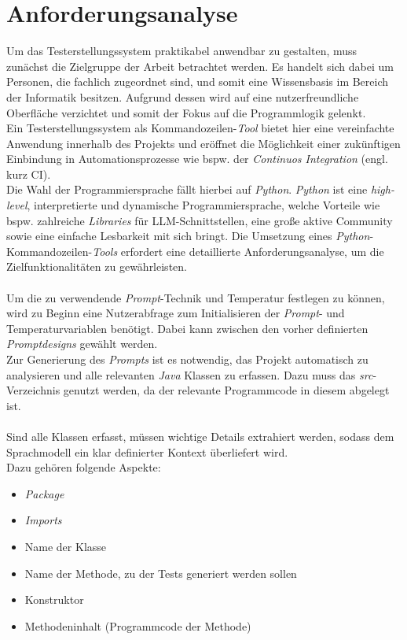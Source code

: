 \section{Anforderungsanalyse}\label{section:anford}
Um das Testerstellungssystem praktikabel anwendbar zu gestalten, muss zunächst die Zielgruppe der Arbeit betrachtet werden. Es handelt sich dabei um Personen, die fachlich zugeordnet sind, und somit eine Wissensbasis im Bereich der Informatik besitzen. Aufgrund dessen wird auf eine nutzerfreundliche Oberfläche verzichtet und somit der Fokus auf die Programmlogik gelenkt.\\ Ein Testerstellungssystem als Kommandozeilen-\textit{Tool} bietet hier eine vereinfachte Anwendung innerhalb des Projekts und eröffnet die Möglichkeit einer zukünftigen Einbindung in Automationsprozesse wie bspw. der \textit{Continuos Integration} (engl. kurz CI).\\ Die Wahl der Programmiersprache fällt hierbei auf \textit{Python}. \textit{Python} ist eine \textit{high-level}, interpretierte und dynamische Programmiersprache, welche Vorteile wie bspw. zahlreiche \textit{Libraries} für LLM-Schnittstellen, eine große aktive Community sowie eine einfache Lesbarkeit mit sich bringt. \cite*{PythonLanguageAdvantages2017} Die Umsetzung eines \textit{Python}-Kommandozeilen-\textit{Tools} erfordert eine detaillierte Anforderungsanalyse, um die Zielfunktionalitäten zu gewährleisten.\\\\
Um die zu verwendende \textit{Prompt}-Technik und Temperatur festlegen zu können, wird zu Beginn eine Nutzerabfrage zum Initialisieren der \textit{Prompt}- und Temperaturvariablen benötigt. Dabei kann zwischen den vorher definierten \textit{Promptdesigns} gewählt werden. \\ Zur Generierung des \textit{Prompts} ist es notwendig, das Projekt automatisch zu analysieren und alle relevanten \textit{Java} Klassen zu erfassen. Dazu muss das \textit{src}-Verzeichnis genutzt werden, da der relevante Programmcode in diesem abgelegt ist.\\\\ Sind alle Klassen erfasst, müssen wichtige Details extrahiert werden, sodass dem Sprachmodell ein klar definierter Kontext überliefert wird.\\ Dazu gehören folgende Aspekte:
\begin{itemize}
    \setlength{\parskip}{1pt}
    \item \textit{Package}
    \item \textit{Imports}
    \item Name der Klasse
    \item Name der Methode, zu der Tests generiert werden sollen
    \item Konstruktor
    \item Methodeninhalt (Programmcode der Methode)
\end{itemize}
